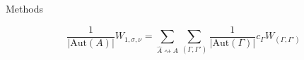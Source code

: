 \documentclass{beamer}
\newcommand{\Aut}{\text{Aut}}
\theoremstyle{definition}
\begin{document}
\begin{frame}{Methods}
                                                                                                                                                                                                                            \begin{figure}
                                                                                                                                                                                                                              \centering
                                                                                                                                                                                                                              \[
                                                                                                                                                                                                                            \frac 1{|\Aut(A)|}W_{1,\sigma,\nu}=\sum_{\hat A\rightsquigarrow A}\sum_{(\Gamma,\Gamma')}\frac 1{|\Aut(\Gamma)|}c_{\Gamma}W_{(\Gamma,\Gamma')}
                                                                                                                                                                                                                            \]
                                                                                                                                                                                                                            \end{figure}
                                                                                                                                                                                                                          \end{frame}
\end{document}
